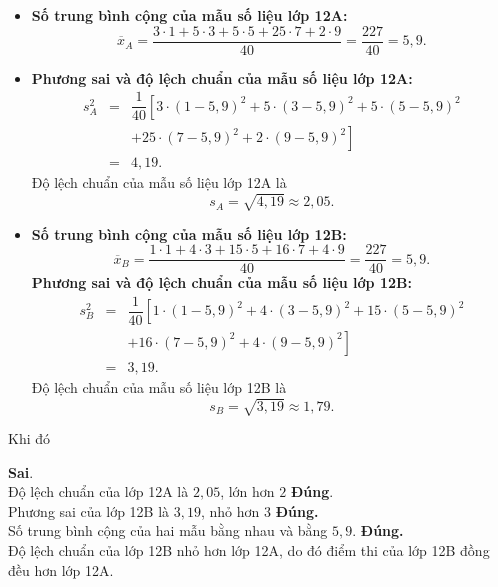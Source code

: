 \begin{ex}
{\begin{itemize}
			\item 
			\textbf{Số trung bình cộng của mẫu số liệu lớp 12A:}
			\[
			\overline{x}_A = \dfrac{3 \cdot 1 + 5 \cdot 3 + 5 \cdot 5 + 25 \cdot 7 + 2 \cdot 9}{40} = \dfrac{227}{40} = 5,9.
			\]
			\item \textbf{Phương sai và độ lệch chuẩn của mẫu số liệu lớp 12A:}
			\begin{eqnarray*}
				s_A^2 &=& \dfrac{1}{40} \left[3 \cdot (1 - 5,9)^2 + 5 \cdot (3 - 5,9)^2 + 5 \cdot (5 - 5,9)^2\right. \\
				&&\left.+ 25 \cdot (7 - 5,9)^2 + 2 \cdot (9 - 5,9)^2\right]\\
				&=&  4{,}19.
			\end{eqnarray*}
			Độ lệch chuẩn của mẫu số liệu lớp 12A là
			\[
			s_A = \sqrt{4{,}19} \approx 2{,}05.
			\]
			\item \textbf{Số trung bình cộng của mẫu số liệu lớp 12B:}
			\[
			\overline{x}_B = \dfrac{1 \cdot 1 + 4 \cdot 3 + 15 \cdot 5 + 16 \cdot 7 + 4 \cdot 9}{40} = \dfrac{227}{40} = 5{,}9.
			\]			
			\textbf{Phương sai và độ lệch chuẩn của mẫu số liệu lớp 12B:}
			\begin{eqnarray*}
				s_B^2 &=& \dfrac{1}{40} \left[1 \cdot (1 - 5,9)^2 + 4 \cdot (3 - 5,9)^2 + 15 \cdot (5 - 5,9)^2\right.\\
				&&\left.+ 16 \cdot (7 - 5,9)^2 + 4 \cdot (9 - 5,9)^2\right] \\
				&=&3{,}19.
			\end{eqnarray*}
			Độ lệch chuẩn của mẫu số liệu lớp 12B là
			\[
			s_B = \sqrt{3{,}19} \approx 1{,}79.
			\]
		\end{itemize}
		Khi đó 
		\begin{itemchoice} 
			\itemch \textbf{Sai}.\\
			Độ lệch chuẩn của lớp 12A là $2{,}05$, lớn hơn $2$ 
			\itemch \textbf{Đúng}.\\
			Phương sai của lớp 12B là $3{,}19$, nhỏ hơn $3$
			\itemch \textbf{Đúng.} \\
			Số trung bình cộng của hai mẫu bằng nhau và bằng $5{,}9$.
			\itemch \textbf{Đúng.} \\
			Độ lệch chuẩn của lớp 12B nhỏ hơn lớp 12A, do đó điểm thi của lớp 12B đồng đều hơn lớp 12A.
		\end{itemchoice}
	}
\end{ex}

